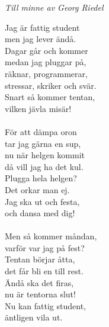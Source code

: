 \documentclass[a6paper, 10pt, twoside]{article}
\begin{document}
\begin{center}
    \textit{Till minne av Georg Riedel}
\end{center}
\begin{lyrics}
Jag är fattig student \\
men jag lever ändå. \\
Dagar går och kommer \\
medan jag pluggar på, \\
räknar, programmerar, \\
stressar, skriker och svär. \\
Snart så kommer tentan, \\
vilken jävla misär! \\
\vspace{2pt}\\
För att dämpa oron \\
tar jag gärna en sup, \\
nu när helgen kommit \\
då vill jag ha det kul. \\
Plugga hela helgen? \\ 
Det orkar man ej.\\
Jag ska ut och festa, \\
och dansa med dig!\\
\vspace{2pt}\\
Men så kommer måndan, \\
varför var jag på fest? \\
Tentan börjar åtta, \\
det får bli en till rest. \\
Ändå ska det firas, \\ 
nu är tentorna slut! \\
Nu kan fattig student, \\
äntligen vila ut.

\end{lyrics}

\end{document}
